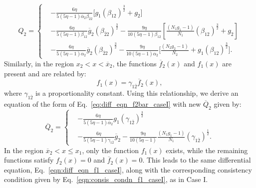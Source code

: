 \documentclass[fleqn]{article}
\begin{document}
            \begin{equation}
                Q_{2}  =  \left\{ \begin{aligned}
                            &  - \frac{6 \eta}{5 (5\eta -1)\overline{\alpha}_{2} \beta_{\overline{2}2}} \biggl[ g_{1} (\beta_{12})^\frac{3}{2} + g_{2} \biggr] \\ & 
                             - \frac{6 \eta}{5 (5 \eta -1) \beta_{12}} \overline{g}_{2} (\beta_{\overline{2}2})^\frac{3}{2} - \frac{9 \eta}{10 (5\eta-1) \beta_{12}} \left[ \frac{(N_{1}g_{1} -1)}{N_{1}}(\beta_{12})^\frac{3}{2} + g_{2} \right] \\ &
                             - \frac{6 \eta}{5 (5 \eta -1) \alpha_{2}} \overline{g}_{2} (\beta_{\overline{2}2})^\frac{3}{2} - \frac{9 \eta}{10 (5 \eta -1 ) \alpha_{2}} \biggl[ \frac{(N_{2}g_{2} -1)}{N_{2}} + g_{1} (\beta_{12})^\frac{3}{2} \biggr].
                        \end{aligned}
                \right.
                \label{eqn:consis_condn_f2_caseII}
            \end{equation}
            Similarly, in the region $x_2 < x < \overline{x}_{2}$, the functions $\overline{f}_{2}(x)$ and $f_1(x)$ are present and are related by:  
            \[
            f_1(x) = \gamma_{1\overline{2}} \overline{f}_{2}(x),
            \]  
            where $\gamma_{1\overline{2}}$ is a proportionality constant. Using this relationship, we derive an equation of the form of Eq.~\eqref{eq:diff_eqn_f2bar_caseI} with new $\overline{Q}_2$ given by: 
            \begin{equation}
                \overline{Q}_{2} = \left\{ \begin{aligned}
                    &  - \frac{6 \eta}{5 (5 \eta -1) \overline{\alpha}_{2}} g_{1} (\gamma_{1\overline{2}})^\frac{3}{2}\\ &   -\frac{6\eta}{5(5\eta-1) \gamma_{1\overline{2}}}    \overline{g}_{2} - \frac{9 \eta}{10 (5\eta -1)} \frac{(N_{1}g_{1} -1)}{N_{1}} (\gamma_{1\overline{2}})^\frac{1}{2} .
                \end{aligned}
                \right. \label{eqn:consis_condn_f2bar_caseII}
            \end{equation}
            In the region $\overline{x}_{2} < x \leq x_1$, only the function $f_1(x)$ exists, while the remaining functions satisfy $f_2(x) = 0$ and $\overline{f}_{2}(x) = 0$. This leads to the same differential equation, Eq.~\eqref{eqn:diff_eqn_f1_caseI}, along with the corresponding consistency condition given by Eq.~\eqref{eqn:consis_condn_f1_caseI}, as in Case I.
\end{document}
